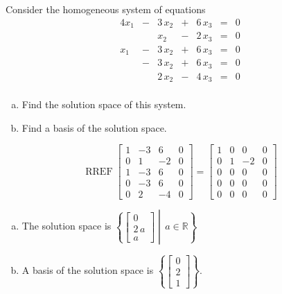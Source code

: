 
\begin{exerciseStatement}


Consider the homogeneous system of equations 
\begin{alignat*}{4} x_{1} &-& 3 \, x_{2} &+& 6 \, x_{3} &=& 0 \\ & & x_{2} &-& 2 \, x_{3} &=& 0 \\x_{1} &-& 3 \, x_{2} &+& 6 \, x_{3} &=& 0 \\ &-& 3 \, x_{2} &+& 6 \, x_{3} &=& 0 \\ & & 2 \, x_{2} &-& 4 \, x_{3} &=& 0 \\ \end{alignat*}
            


\begin{enumerate}[(a)]
\item  Find the solution space of this system.
\item  Find a basis of the solution space.
\end{enumerate}
    
\end{exerciseStatement}
    
\begin{exerciseAnswer} 


\[\operatorname{RREF} \left[\begin{array}{ccc|c}
1 & -3 & 6 & 0 \\
0 & 1 & -2 & 0 \\
1 & -3 & 6 & 0 \\
0 & -3 & 6 & 0 \\
0 & 2 & -4 & 0
\end{array}\right] = \left[\begin{array}{ccc|c}
1 & 0 & 0 & 0 \\
0 & 1 & -2 & 0 \\
0 & 0 & 0 & 0 \\
0 & 0 & 0 & 0 \\
0 & 0 & 0 & 0
\end{array}\right] \]


\begin{enumerate}[(a)]
\item The solution space is \( \left\{ \left[\begin{array}{c}
0 \\
2 \, a \\
a
\end{array}\right] \middle|\,a\in\mathbb{R}\right\} \)
\item A basis of the solution space is \( \left\{ \left[\begin{array}{c}
0 \\
2 \\
1
\end{array}\right] \right\} \).
\end{enumerate}
    
\end{exerciseAnswer}
    
